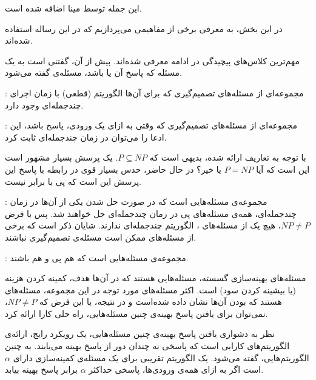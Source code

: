 

این جمله توسط مینا اضافه شده است.

در این بخش، به معرفی برخی از مفاهیمی می‌پردازیم که در این رساله استفاده شده‌اند.


مهم‌ترین کلاس‌های پیچیدگی در ادامه معرفی شده‌اند. پیش از آن، گفتنی است به یک مسئله که پاسخ آن  یا  باشد، مسئله‌ی  گفته می‌شود.

: مجموعه‌ای از مسئله‌های تصمیم‌گیری که برای آن‌ها الگوریتم (قطعی) با زمان اجرای چند‌جمله‌ای وجود دارد.

: مجموعه‌ای از مسئله‌های تصمیم‌گیری که وقتی به ازای یک ورودی، پاسخ  باشد، این ادعا را می‌توان در زمان چند‌جمله‌ای ثابت کرد.

با توجه به تعاریف ارائه شده، بدیهی است که $P \subseteq NP$. یک پرسش بسیار مشهور است این است که آیا $P = NP$ یا خیر؟ در حال حاضر، حدس بسیار قوی در رابطه با پاسخ این پرسش این است که ‌پی{} با  برابر نیست.

: مجموعه‌ی مسئله‌هایی است که در صورت حل شدن یکی از آن‌ها در زمان چند‌جمله‌ای، همه‌ی مسئله‌های ‌پی{} در زمان چند‌جمله‌ای حل خواهند شد. پس با فرض $NP \neq P$، هیچ یک از مسئله‌های ، الگوریتم چند‌جمله‌ای ندارند. شایان ذکر است که برخی از مسئله‌های  ممکن است مسئله‌ی تصمیم‌گیری نباشند.

: مجموعه‌ی مسئله‌هایی است که هم ‌پی{} و هم  باشند.


مسئله‌های بهینه‌سازی گسسته، مسئله‌هایی هستند که در آن‌ها هدف، کمینه کردن هزینه (یا بیشینه کردن سود) است. اکثر مسئله‌های مورد توجه در این مجموعه، مسئله‌های هستند که  بودن آن‌ها نشان داده شده‌است و در نتیجه، با این فرض که $NP \neq P$، نمی‌توان برای یافتن پاسخ بهینه‌ی چنین مسئله‌هایی، راه حلی کارا ارائه کرد.

نظر به دشواری یافتن پاسخ بهینه‌ی چنین مسئله‌هایی، یک رویکرد رایج، ارائه‌ی الگوریتم‌های کارایی است که پاسخی نه چندان دور از پاسخ بهینه می‌یابند. به چنین الگوریتم‌هایی،  گفته می‌شود. یک الگوریتم تقریبی برای یک مسئله‌ی کمینه‌سازی دارای  $\alpha$ است اگر به ازای همه‌ی ورودی‌ها، پاسخی حد‌اکثر $\alpha$ برابر پاسخ بهینه بیابد.



